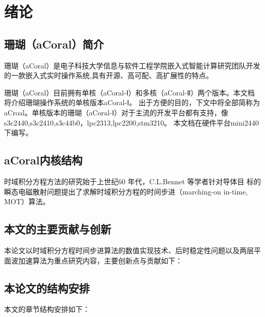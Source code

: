 \chapter{绪\hspace{6pt}论}

\section{珊瑚（aCoral）简介}

珊瑚（aCoral）是电子科技大学信息与软件工程学院嵌入式智能计算研究团队开发的一款嵌入式实时操作系统,具有开源、高可配、高扩展性的特点。

珊瑚（aCoral）目前拥有单核（aCoral-Ⅰ）和多核（aCoral-Ⅱ）两个版本。本文档将介绍珊瑚操作系统的单核版本aCoral-Ⅰ。
出于方便的目的，下文中将全部简称为aCroal。单核版本的珊瑚（aCoral-Ⅰ）对于主流的开发平台都有支持，像 s3c2440,s3c2410,s3c44b0，lpc2313,lpc2200,stm3210。
本文档在硬件平台mini2440下编写。


\section{aCoral内核结构}
时域积分方程方法的研究始于上世纪60 年代，C.L.Bennet 等学者针对导体目
标的瞬态电磁散射问题提出了求解时域积分方程的时间步进（marching-on in-time,
MOT）算法。

\section{本文的主要贡献与创新}
本论文以时域积分方程时间步进算法的数值实现技术、后时稳定性问题以及两层平面波加速算法为重点研究内容，主要创新点与贡献如下：

\section{本论文的结构安排}
本文的章节结构安排如下：
